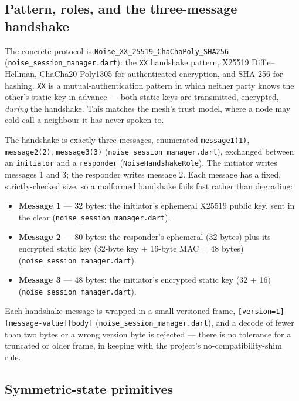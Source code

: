 \documentclass[11pt]{report}
\newcommand{\code}[1]{\texttt{\small #1}}
\begin{document}
\subsection*{Pattern, roles, and the three-message handshake}

The concrete protocol is \code{Noise\_XX\_25519\_ChaChaPoly\_SHA256} (\code{noise\_session\_manager.dart}): the \code{XX} handshake pattern, X25519 Diffie--Hellman, ChaCha20-Poly1305 for authenticated encryption, and SHA-256 for hashing. \code{XX} is a mutual-authentication pattern in which neither party knows the other's static key in advance --- both static keys are transmitted, encrypted, \emph{during} the handshake. This matches the mesh's trust model, where a node may cold-call a neighbour it has never spoken to.

The handshake is exactly three messages, enumerated \code{message1(1)}, \code{message2(2)}, \code{message3(3)} (\code{noise\_session\_manager.dart}), exchanged between an \code{initiator} and a \code{responder} (\code{NoiseHandshakeRole}). The initiator writes messages 1 and 3; the responder writes message 2. Each message has a fixed, strictly-checked size, so a malformed handshake fails fast rather than degrading:

\begin{itemize}
  \item \textbf{Message 1} --- 32 bytes: the initiator's ephemeral X25519 public key, sent in the clear (\code{noise\_session\_manager.dart}).
  \item \textbf{Message 2} --- 80 bytes: the responder's ephemeral (32 bytes) plus its encrypted static key (32-byte key + 16-byte MAC = 48 bytes) (\code{noise\_session\_manager.dart}).
  \item \textbf{Message 3} --- 48 bytes: the initiator's encrypted static key (32 + 16) (\code{noise\_session\_manager.dart}).
\end{itemize}

Each handshake message is wrapped in a small versioned frame, \code{[version=1][message-value][body]} (\code{noise\_session\_manager.dart}), and a decode of fewer than two bytes or a wrong version byte is rejected --- there is no tolerance for a truncated or older frame, in keeping with the project's no-compatibility-shim rule.

\subsection*{Symmetric-state primitives}
\end{document}
